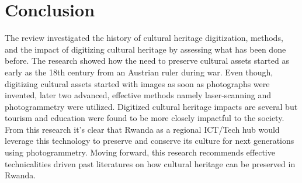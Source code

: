 \documentclass[conference]{IEEEtran}
\begin{document}
\section{\textbf{Conclusion}}
The review investigated the history of cultural heritage digitization, methods, and the impact of digitizing cultural heritage by assessing what has been done before.
The research showed how the need to preserve cultural assets started as early as the 18th century from an Austrian ruler during war. Even though, digitizing cultural assets started with images as soon as photographs were invented, later two
advanced, effective methods namely laser-scanning and photogrammetry were utilized. Digitized cultural heritage impacts are several but tourism and education were found to be more closely impactful to the society. From this research it's clear
that Rwanda as a regional ICT/Tech hub \cite{rwtechub} would leverage this technology to preserve and conserve its culture for next generations using photogrammetry. Moving forward, this research recommends effective technicalities driven past literatures on how
cultural heritage can be preserved in Rwanda.


\printbibliography
\end{document}
